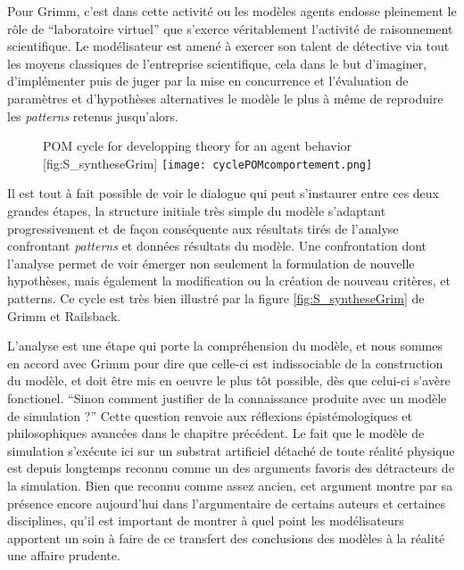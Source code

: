 Pour Grimm, c'est dans cette activité ou les modèles agents endosse pleinement le rôle de \enquote{laboratoire virtuel} que s'exerce véritablement l'activité de raisonnement scientifique. Le modélisateur est amené à exercer son talent de détective via tout les moyens classiques de l'entreprise scientifique, cela dans le but d'imaginer, d'implémenter puis de juger par la mise en concurrence et l'évaluation de paramètres et d'hypothèses alternatives le modèle le plus à même de reproduire les \textit{patterns} retenus jusqu'alors. 

\begin{figure}[h]
\begin{sidecaption}[fortoc]{ POM cycle for developping theory for an agent behavior \autocite[245]{Railsback2012}}[fig:S_syntheseGrim]
  \centering
 \texttt{[image: cyclePOMcomportement.png]}
  \end{sidecaption}
\end{figure}

Il est tout à fait possible de voir le dialogue qui peut s'instaurer entre ces deux grandes étapes, la structure initiale très simple du modèle s'adaptant progressivement et de façon conséquente aux résultats tirés de l'analyse confrontant \textit{patterns} et données résultats du modèle. Une confrontation dont l'analyse permet de voir émerger non seulement la formulation de nouvelle hypothèses, mais également la modification ou la création de nouveau critères, et patterns. Ce cycle est très bien illustré par la figure \ref{fig:S_syntheseGrim} de Grimm et Railsback.

L'analyse est une étape qui porte la compréhension du modèle, et nous sommes en accord avec Grimm pour dire que celle-ci est indissociable de la construction du modèle, et doit être mis en oeuvre le plus tôt possible, dès que celui-ci s'avère fonctionel. \enquote{Sinon comment justifier de la connaissance produite avec un modèle de simulation ?} Cette question renvoie aux réflexions épistémologiques et philosophiques avancées dans le chapitre précédent. Le fait que le modèle de simulation s'exécute ici sur un substrat artificiel détaché de toute réalité physique est depuis longtemps reconnu comme un des arguments favoris des détracteurs de la simulation. Bien que reconnu comme assez ancien, cet argument montre par sa présence encore aujourd'hui dans l'argumentaire de certains auteurs et certaines disciplines, qu'il est important de montrer à quel point les modélisateurs apportent un soin à faire de ce transfert des conclusions des modèles à la réalité une affaire prudente. %

